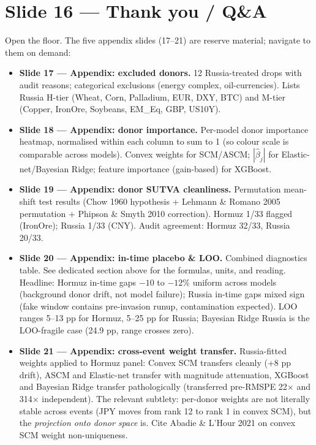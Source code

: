 \documentclass[11pt,a4paper]{article}
\begin{document}
\section{Slide 16 --- Thank you / Q\&A}

Open the floor. The five appendix slides (17--21) are reserve material; navigate to them on demand:

\begin{itemize}
  \item \textbf{Slide 17 --- Appendix: excluded donors.} 12 Russia-treated drops with audit reasons; categorical exclusions (energy complex, oil-currencies). Lists Russia H-tier (Wheat, Corn, Palladium, EUR, DXY, BTC) and M-tier (Copper, IronOre, Soybeans, EM\_Eq, GBP, US10Y).
  \item \textbf{Slide 18 --- Appendix: donor importance.} Per-model donor importance heatmap, normalised within each column to sum to 1 (so colour scale is comparable across models). Convex weights for SCM/ASCM; $|\hat\beta_j|$ for Elastic-net/Bayesian Ridge; feature importance (gain-based) for XGBoost.
  \item \textbf{Slide 19 --- Appendix: donor SUTVA cleanliness.} Permutation mean-shift test results (Chow 1960 hypothesis + Lehmann \& Romano 2005 permutation + Phipson \& Smyth 2010 correction). Hormuz 1/33 flagged (IronOre); Russia 1/33 (CNY). Audit agreement: Hormuz 32/33, Russia 20/33.
  \item \textbf{Slide 20 --- Appendix: in-time placebo \& LOO.} Combined diagnostics table. See dedicated section above for the formulas, units, and reading. Headline: Hormuz in-time gaps $-10$ to $-12\%$ uniform across models (background donor drift, not model failure); Russia in-time gaps mixed sign (fake window contains pre-invasion runup, contamination expected). LOO ranges 5--13 pp for Hormuz, 5--25 pp for Russia; Bayesian Ridge Russia is the LOO-fragile case (24.9 pp, range crosses zero).
  \item \textbf{Slide 21 --- Appendix: cross-event weight transfer.} Russia-fitted weights applied to Hormuz panel: Convex SCM transfers cleanly (+8 pp drift), ASCM and Elastic-net transfer with magnitude attenuation, XGBoost and Bayesian Ridge transfer pathologically (transferred pre-RMSPE 22$\times$ and 314$\times$ independent). The relevant subtlety: per-donor weights are not literally stable across events (JPY moves from rank 12 to rank 1 in convex SCM), but the \emph{projection onto donor space} is. Cite Abadie \& L'Hour 2021 on convex SCM weight non-uniqueness.
\end{itemize}
\end{document}
